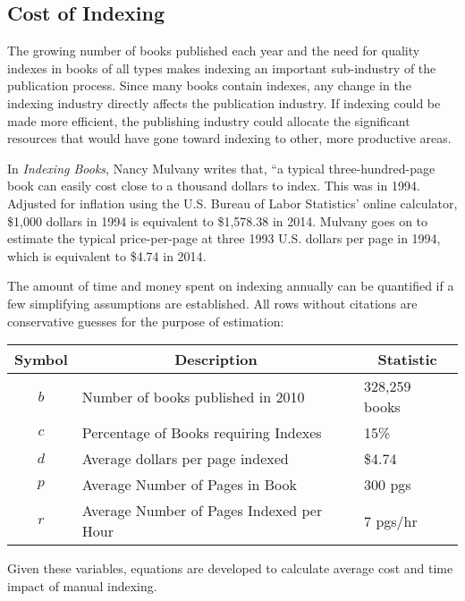 \subsection{Cost of Indexing}

The growing number of books published each year and the need for quality indexes in books of all types makes indexing an important sub-industry of the publication process.
Since many books contain indexes, any change in the indexing industry directly affects the publication industry.
If indexing could be made more efficient, the publishing industry could allocate the significant resources that would have gone toward indexing to other, more productive areas.

In {\it Indexing Books}, Nancy Mulvany writes that, ``a typical three-hundred-page book can easily cost close to a thousand dollars to index.
This was in 1994.
Adjusted for inflation using the U.S. Bureau of Labor Statistics' online calculator, \$1,000 dollars in 1994 is equivalent to \$1,578.38 in 2014\cite{inflation-calculator}.
Mulvany goes on to estimate the typical price-per-page at three 1993 U.S. dollars per page in 1994\cite{mulvany}, which is equivalent to \$4.74 in 2014\cite{inflation-calculator}.

The amount of time and money spent on indexing annually can be quantified if a few simplifying assumptions are established.
All rows without citations are conservative guesses for the purpose of estimation:

\begin{center}
\begin{tabular}{|c|l|l|}
\hline
\multicolumn{1}{|c|}{{\bf Symbol}} & \multicolumn{1}{c|}{{\bf Description}} & \multicolumn{1}{c|}{{\bf Statistic}} \\
\hline
$b$ & Number of books published in 2010 \cite{bowker} & 328,259 books \\
\hline
$c$ & Percentage of Books requiring Indexes & 15\% \\
\hline
$d$ & Average dollars per page indexed \cite{mulvany,inflation-calculator} & \$4.74 \\
\hline 
$p$ & Average Number of Pages in Book & 300 pgs \\ 
\hline 
$r$ & Average Number of Pages Indexed per Hour \cite{connolly} & 7 pgs/hr \\
\hline
\end{tabular}
\end{center}

Given these variables, equations are developed to calculate average cost and time impact of manual indexing.

